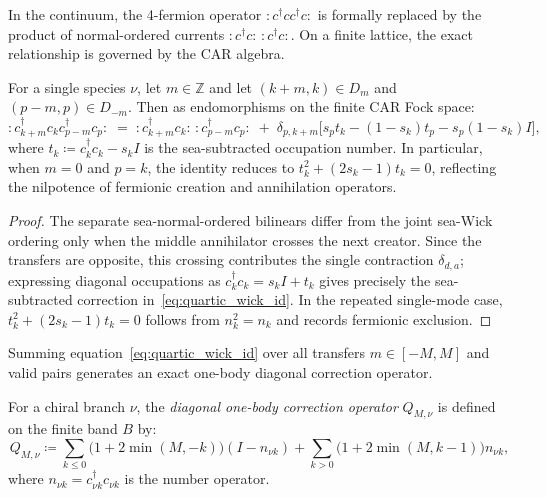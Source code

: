 In the continuum, the 4-fermion operator $:c^\dagger c c^\dagger c:$ is formally replaced by the product of normal-ordered currents $:\!c^\dagger c\!:\,:\!c^\dagger c\!:$. On a finite lattice, the exact relationship is governed by the CAR algebra.

\begin{lemma}
\label{lem:sea_wick_contraction}
For a single species $\nu$, let $m \in \mathbb{Z}$ and let $(k+m, k) \in D_m$ and $(p-m, p) \in D_{-m}$.
Then as endomorphisms on the finite CAR Fock space:
\begin{equation}
\label{eq:quartic_wick_id}
:\! c_{k+m}^\dagger c_k c_{p-m}^\dagger c_p \!: \;= \;:\! c_{k+m}^\dagger c_k \!:\, : \! c_{p-m}^\dagger c_p \!: \;+ \; \delta_{p, k+m} \Big[ s_p t_k - (1-s_k) t_p - s_p(1-s_k) I \Big],
\end{equation}
where $t_k \coloneqq c_k^\dagger c_k - s_k I$ is the sea-subtracted occupation number.
In particular, when $m = 0$ and $p = k$, the identity reduces to $t_k^2 + (2s_k - 1)t_k = 0$, reflecting the nilpotence of fermionic creation and annihilation operators.
\end{lemma}

\begin{proof}
The separate sea-normal-ordered bilinears differ from the joint sea-Wick ordering only when the middle annihilator crosses the next creator. Since the transfers are opposite, this crossing contributes the single contraction $\delta_{d,a}$; expressing diagonal occupations as $c_k^\dagger c_k=s_k I+t_k$ gives precisely the sea-subtracted correction in~\eqref{eq:quartic_wick_id}. In the repeated single-mode case, $t_k^2+(2s_k-1)t_k=0$ follows from $n_k^2=n_k$ and records fermionic exclusion.
\end{proof}

Summing equation~\eqref{eq:quartic_wick_id} over all transfers $m \in [-M, M]$ and valid pairs generates an exact one-body diagonal correction operator.

\begin{definition}
For a chiral branch $\nu$, the \emph{diagonal one-body correction operator} $Q_{M, \nu}$ is defined on the finite band $B$ by:
\begin{equation}
Q_{M, \nu} \coloneqq \sum_{k \le 0} \Big( 1 + 2\min(M, -k) \Big) (I - n_{\nu k}) + \sum_{k > 0} \Big( 1 + 2\min(M, k-1) \Big) n_{\nu k},
\end{equation}
where $n_{\nu k} = c_{\nu k}^\dagger c_{\nu k}$ is the number operator.
\end{definition}

